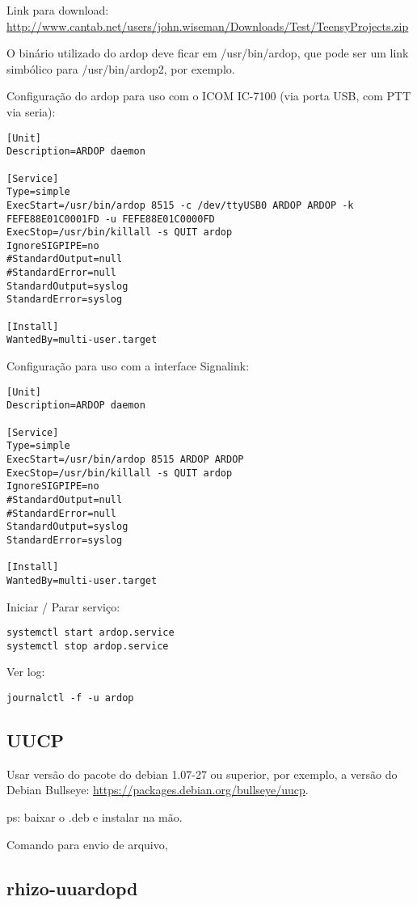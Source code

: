 \documentclass[11pt,a4paper]{article}
\begin{document}
Link para download: \url{http://www.cantab.net/users/john.wiseman/Downloads/Test/TeensyProjects.zip}

O binário utilizado do ardop deve ficar em /usr/bin/ardop, que pode ser um
link simbólico para /usr/bin/ardop2, por exemplo.

Configuração do ardop para uso com o ICOM IC-7100 (via porta USB, com PTT
via seria):
\begin{verbatim}
[Unit]
Description=ARDOP daemon

[Service]
Type=simple
ExecStart=/usr/bin/ardop 8515 -c /dev/ttyUSB0 ARDOP ARDOP -k FEFE88E01C0001FD -u FEFE88E01C0000FD
ExecStop=/usr/bin/killall -s QUIT ardop
IgnoreSIGPIPE=no
#StandardOutput=null
#StandardError=null
StandardOutput=syslog
StandardError=syslog

[Install]
WantedBy=multi-user.target
\end{verbatim}

Configuração para uso com a interface Signalink:
\begin{verbatim}
[Unit]
Description=ARDOP daemon

[Service]
Type=simple
ExecStart=/usr/bin/ardop 8515 ARDOP ARDOP
ExecStop=/usr/bin/killall -s QUIT ardop
IgnoreSIGPIPE=no
#StandardOutput=null
#StandardError=null
StandardOutput=syslog
StandardError=syslog

[Install]
WantedBy=multi-user.target
\end{verbatim}


Iniciar / Parar serviço:
\begin{verbatim}
systemctl start ardop.service
systemctl stop ardop.service
\end{verbatim}


Ver log:
\begin{verbatim}
journalctl -f -u ardop
\end{verbatim}

\subsection{UUCP}

Usar versão do pacote do debian 1.07-27 ou superior, por exemplo, a versão
do Debian Bullseye: \url{https://packages.debian.org/bullseye/uucp}.

ps: baixar o .deb e instalar na mão.

Comando para envio de arquivo, 

\subsec

\subsection{rhizo-uuardopd}
\end{document}
